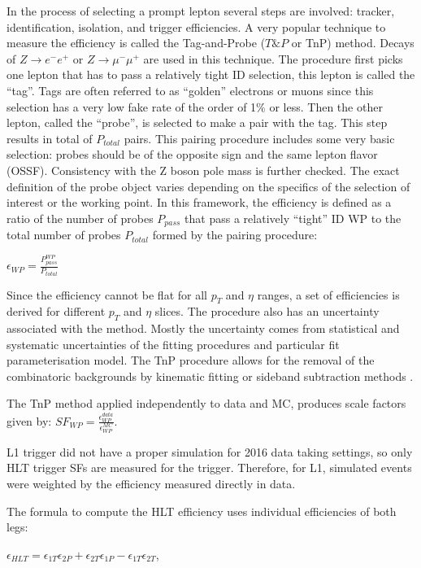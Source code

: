 \begin{small}
In the process of selecting a prompt lepton several steps are involved: tracker, identification, isolation, and trigger efficiencies. A very popular technique to measure the efficiency is called the Tag-and-Probe ($T\&P$ or TnP) method. Decays of $Z \rightarrow e^- e^+$ or $Z \rightarrow \mu^- \mu^+$ are used in this technique. The procedure first picks one lepton that has to pass a relatively tight ID selection, this lepton is called the ``tag''. Tags are often referred to as ``golden'' electrons or muons since this selection has a very low fake rate of the order of 1$\%$ or less. Then the other lepton, called the ``probe'', is selected to make a pair with the tag. This step results in total of $P_{total}$ pairs. This pairing procedure includes some very basic selection:  probes should be of the opposite sign and the same lepton flavor (OSSF). Consistency with the Z boson pole mass is further checked. The exact definition of the probe object varies depending on the specifics of the selection of interest or the working point. In this framework, the efficiency is defined as a ratio of the number of probes $P_{pass}$ that pass a relatively ``tight'' ID WP to the total number of probes $P_{total}$ formed by the pairing procedure:

$\epsilon_{WP} = \frac{P^{WP} _{pass}}{P_{total}} $

Since the efficiency cannot be flat for all $p_T$ and $\eta$ ranges, a set of efficiencies is derived for different $p_T$ and $\eta$ slices. The procedure also has an uncertainty associated with the method. Mostly the uncertainty comes from statistical and systematic uncertainties of the fitting procedures and particular fit parameterisation model. The TnP procedure allows for the removal of the combinatoric backgrounds by kinematic fitting or sideband subtraction methods \cite{TnP}. 

The TnP method applied independently to data and MC, produces scale factors given by:
$SF_{WP} = \frac{\epsilon^{data}_{WP}}{\epsilon^{MC}_{WP}}$.

L1 trigger did not have a proper simulation for 2016 data taking settings, so only HLT trigger SFs are measured for the trigger. Therefore, for L1, simulated events were weighted by the efficiency measured directly in data. 

The formula to compute the HLT efficiency uses individual efficiencies of both legs:

$\epsilon_{HLT} = \epsilon_{1T}\epsilon_{2P} + \epsilon_{2T}\epsilon_{1P} - \epsilon_{1T}\epsilon_{2T}$,


\end{small}
